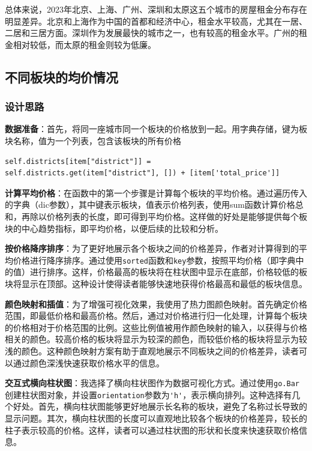 \documentclass[lang=cn,11pt,a4paper]{elegantpaper}
\begin{document}
总体来说，2023年北京、上海、广州、深圳和太原这五个城市的房屋租金分布存在明显差异。北京和上海作为中国的首都和经济中心，租金水平较高，尤其在一居、二居和三居方面。深圳作为发展最快的城市之一，也有较高的租金水平。广州的租金相对较低，而太原的租金则较为低廉。

\subsection{不同板块的均价情况}

\subsubsection{设计思路}

\textbf{数据准备}：首先，将同一座城市同一个板块的价格放到一起。用字典存储，键为板块名称，值为一个列表，包含该板块的所有价格
\begin{lstlisting}
self.districts[item["district"]] = self.districts.get(item["district"], []) + [item['total_price']]
\end{lstlisting}

\textbf{计算平均价格}：在函数中的第一个步骤是计算每个板块的平均价格。通过遍历传入的字典（dic参数），其中键表示板块，值表示价格列表，使用sum函数计算价格总和，再除以价格列表的长度，即可得到平均价格。这样做的好处是能够提供每个板块的中心趋势指标，即平均价格，以便后续的比较和分析。

\textbf{按价格降序排序}：为了更好地展示各个板块之间的价格差异，作者对计算得到的平均价格进行降序排序。通过使用\lstinline{sorted}函数和\lstinline{key}参数，按照平均价格（即字典中的值）进行排序。这样，价格最高的板块将在柱状图中显示在底部，价格较低的板块将显示在顶部。这种设计使得读者能够快速地获得价格最高和最低的板块信息。

\textbf{颜色映射和插值}：为了增强可视化效果，我使用了热力图颜色映射。首先确定价格范围，即最低价格和最高价格。然后，通过对价格进行归一化处理，计算每个板块的价格相对于价格范围的比例。这些比例值被用作颜色映射的输入，以获得与价格相关的颜色。较高价格的板块将显示为较深的颜色，而较低价格的板块将显示为较浅的颜色。这种颜色映射方案有助于直观地展示不同板块之间的价格差异，读者可以通过颜色深浅快速获取价格水平的信息。

\textbf{交互式横向柱状图}：我选择了横向柱状图作为数据可视化方式。通过使用\lstinline{go.Bar}创建柱状图对象，并设置\lstinline{orientation}参数为\lstinline{'h'}，表示横向排列。这种选择有几个好处。首先，横向柱状图能够更好地展示长名称的板块，避免了名称过长导致的显示问题。其次，横向柱状图的长度可以直观地比较各个板块的价格差异，较长的柱子表示较高的价格。这样，读者可以通过柱状图的形状和长度来快速获取价格信息。
\end{document}
